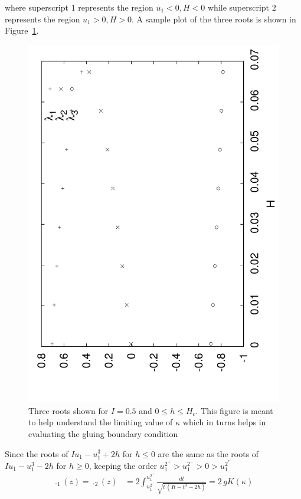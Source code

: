 where superscript $1$ represents the region $u_1<0, H<0$ while superscript $2$ represents the region $u_1>0, H>0$. A sample plot of the three roots is shown in Figure~\ref{F:lambdas}.
\begin{figure}
\begin{center}
\includegraphics[angle=-90,width=\textwidth*7/8]{figures/lambdas}
\caption{Three roots shown for $I = 0.5$ and $0\le h \le H_c$. This figure is meant to help understand the limiting value of $\kappa$ which in turns helps in evaluating the gluing boundary condition}
\label{F:lambdas}
\end{center}
\end{figure}
Since the roots of $I u_1 - u_1^3 + 2 h$ for $h \le 0$ are the same as the roots of $I u_1 - u_1^3 - 2 h$ for $h \ge 0$, keeping the order $u_1^{2^+} > u_1^{2^-} > 0 > u_1^{2^*}$
\[
\begin{aligned}
\period_1(z)= \period_2(z) &= 2\int_{u_1^{{2}^{-}}}^{u_1^{{2}^{+}}}\frac{dt}{\sqrt{ t \,(I t - t^3 - 2 h)}}=2\, g K(\kappa)
\end{aligned}
\]
